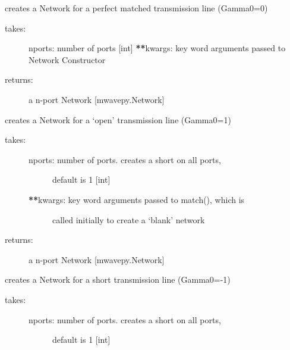 \documentclass[letterpaper,10pt,english]{sphinxmanual}
\begin{document}
\begin{fulllineitems}
\begin{fulllineitems}
\label{auto_workingband:mwavepy.WorkingBand.match}
creates a Network for a perfect matched transmission line (Gamma0=0)
\begin{description}
\item[{takes:}] \leavevmode
nports: number of ports {[}int{]}
{\color{red}\bfseries{}**}kwargs: key word arguments passed to Network Constructor

\item[{returns:}] \leavevmode
a n-port Network {[}mwavepy.Network{]}

\end{description}

\end{fulllineitems}


\begin{fulllineitems}
\label{auto_workingband:mwavepy.WorkingBand.open}
creates a Network for a `open' transmission line (Gamma0=1)
\begin{description}
\item[{takes:}] \leavevmode\begin{description}
\item[{nports: number of ports. creates a short on all ports,}] \leavevmode
default is 1 {[}int{]}

\item[{{\color{red}\bfseries{}**}kwargs: key word arguments passed to match(), which is }] \leavevmode
called initially to create a `blank' network

\end{description}

\item[{returns:}] \leavevmode
a n-port Network {[}mwavepy.Network{]}

\end{description}

\end{fulllineitems}


\begin{fulllineitems}
\label{auto_workingband:mwavepy.WorkingBand.short}
creates a Network for a short  transmission line (Gamma0=-1)
\begin{description}
\item[{takes:}] \leavevmode\begin{description}
\item[{nports: number of ports. creates a short on all ports,}] \leavevmode
default is 1 {[}int{]}


\end{description}
\end{description}
\end{fulllineitems}
\end{fulllineitems}
\end{document}
